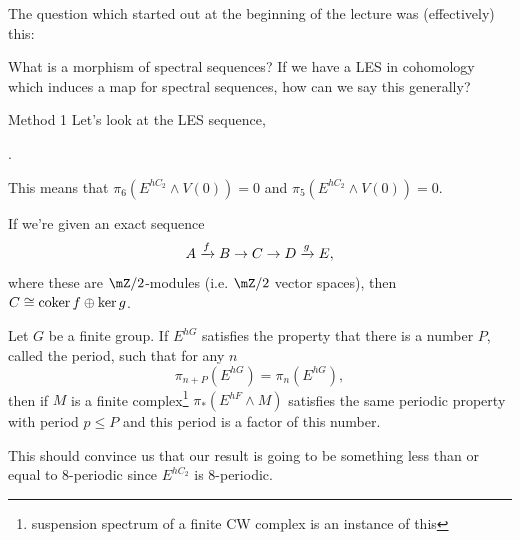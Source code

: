 The question which started out at the beginning of the lecture was (effectively) this: 
\begin{question}{}{}
    What is a morphism of spectral sequences? If we have a LES in cohomology which induces a map for spectral sequences, how can we say this generally?
\end{question}

\begin{remark}{Method 1}
    Let's look at the LES sequence, 
    \begin{center}
      .
    \end{center}
    This means that $\pi_6(E^{hC_2}\wedge V(0)) = 0$ and $\pi_5(E^{hC_2}\wedge V(0))=0.$
\end{remark}

\begin{fact}{}{}
    If we're given an exact sequence $$A\xrightarrow{f}B\to C\to D\xrightarrow{g}E,$$ where these are $\mZ/2$-modules (i.e. $\mZ/2$ vector spaces), then $C\cong \operatorname{\text{coker}} f\oplus \ker g$. 
\end{fact}

\begin{theorem}{}{}
    Let $G$ be a finite group. If $E^{hG}$ satisfies the property that there is a number $P$, called the period, such that for any $n$ $$\pi_{n+P}(E^{hG}) = \pi_{n}(E^{hG}),$$ then if $M$ is a finite complex\footnote{suspension spectrum of a finite CW complex is an instance of this} $\pi_\ast(E^{hF}\wedge M)$ satisfies the same periodic property with period $p\leq P$ and this period is a factor of this number. 
\end{theorem}
This should convince us that our result is going to be something less than or equal to 8-periodic since $E^{hC_2}$ is 8-periodic. 
 


